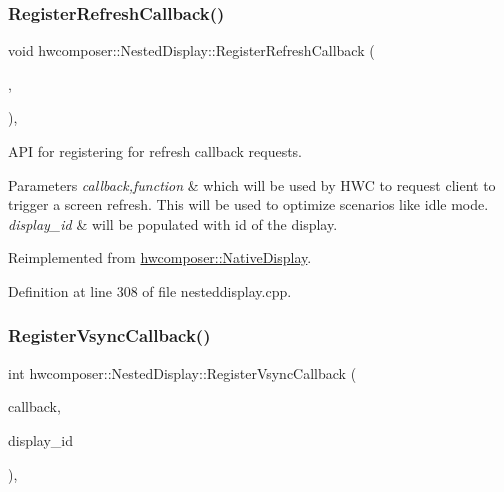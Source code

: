 \subsubsection{\texorpdfstring{Register\+Refresh\+Callback()}{RegisterRefreshCallback()}}
{\footnotesize\ttfamily void hwcomposer\+::\+Nested\+Display\+::\+Register\+Refresh\+Callback (\begin{DoxyParamCaption}\item[{std\+::shared\+\_\+ptr$<$ \mbox{\hyperlink{classhwcomposer_1_1RefreshCallback}{Refresh\+Callback}} $>$}]{,  }\item[{uint32\+\_\+t}]{ }\end{DoxyParamCaption})\hspace{0.3cm}{\ttfamily [override]}, {\ttfamily [virtual]}}

A\+PI for registering for refresh callback requests. 
\begin{DoxyParams}{Parameters}
{\em callback,function} & which will be used by H\+WC to request client to trigger a screen refresh. This will be used to optimize scenarios like idle mode. \\
\hline
{\em display\+\_\+id} & will be populated with id of the display. \\
\hline
\end{DoxyParams}


Reimplemented from \mbox{\hyperlink{classhwcomposer_1_1NativeDisplay_a237627e6cacf9246813bc7f48c5817cd}{hwcomposer\+::\+Native\+Display}}.



Definition at line 308 of file nesteddisplay.\+cpp.


\begin{DoxyCode}{0}
\end{DoxyCode}
\mbox{\label{classhwcomposer_1_1NestedDisplay_a09a16cff82bc26e862eaa2e8bb9cbe67}} 
\subsubsection{\texorpdfstring{Register\+Vsync\+Callback()}{RegisterVsyncCallback()}}
{\footnotesize\ttfamily int hwcomposer\+::\+Nested\+Display\+::\+Register\+Vsync\+Callback (\begin{DoxyParamCaption}\item[{std\+::shared\+\_\+ptr$<$ \mbox{\hyperlink{classhwcomposer_1_1VsyncCallback}{Vsync\+Callback}} $>$}]{callback,  }\item[{uint32\+\_\+t}]{display\+\_\+id }\end{DoxyParamCaption})\hspace{0.3cm}{\ttfamily [override]}, {\ttfamily [virtual]}}



